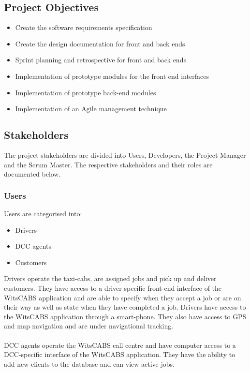 \documentclass[12pt]{article}
\begin{document}
\subsection{Project Objectives}
\begin{itemize}
\item Create the software requirements specification
\item Create the design documentation for front and back ends
\item Sprint planning  and retrospective for front and back ends
\item Implementation of prototype modules for the front end interfaces
\item Implementation of prototype back-end modules
\item Implementation of an Agile management technique
\end{itemize}

\subsection{Stakeholders}
The project stakeholders are divided into Users, Developers, the Project Manager and the Scrum Master. The respective stakeholders and their roles are documented below.
\subsubsection{Users}
Users are categorised into:
\begin{itemize}
\item Drivers
\item DCC agents
\item Customers
\end{itemize} 
Drivers operate the taxi-cabs, are assigned jobs and pick up and deliver customers. They have access to a driver-specific front-end interface of the WitsCABS application and are able to specify when they accept a job or are on their way as well as state when they have completed a job. Drivers have access to the WitsCABS application through a smart-phone. They also have access to GPS and map navigation and are under navigational tracking. \\\\

DCC agents operate the WitsCABS call centre and have computer access to a DCC-specific interface of the WitsCABS application. They have the ability to add new clients to the database and can view active jobs. \\\\
\end{document}
